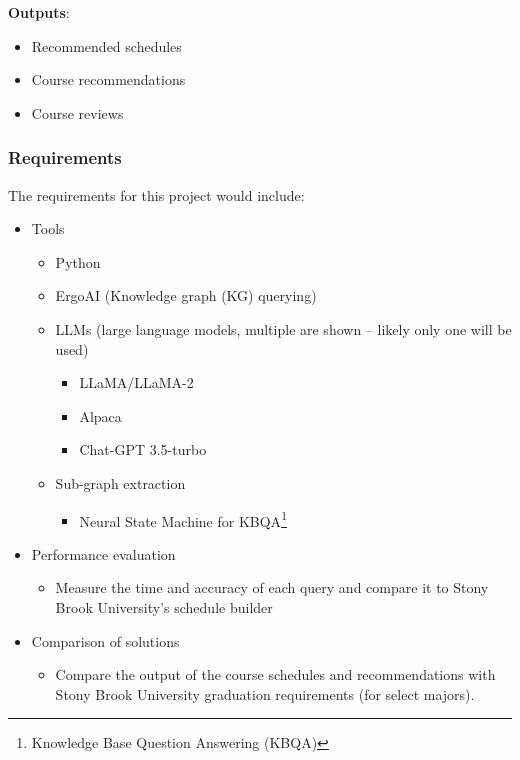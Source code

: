 \documentclass[12pt]{article}
\begin{document}
    \textbf{Outputs}:

    \begin{itemize}
        \label{items:outputs}
        \item Recommended schedules
        \item Course recommendations
        \item Course reviews
    \end{itemize}

    \subsubsection{Requirements}
    \label{subsubsec:reqs}
    The requirements for this project would include:

    \begin{itemize}
        \item Tools
        \begin{itemize}
            \item Python
            \item ErgoAI (Knowledge graph (KG) querying)
            \item LLMs (large language models, multiple are shown -- likely only one will be used)
            \begin{itemize}
                \item LLaMA\cite{touvron2023llama}/LLaMA-2\cite{touvron2023llama2}
                \item Alpaca\cite{alpaca}
                \item Chat-GPT 3.5-turbo\cite{ye2023gpt3.5}
            \end{itemize}
            \item Sub-graph extraction
            \begin{itemize}
                \item Neural State Machine for KBQA\footnote{Knowledge Base Question Answering (KBQA)}\cite{He-WSDM-2021}
            \end{itemize}
        \end{itemize}
        \item Performance evaluation
            \begin{itemize}
                \item Measure the time and accuracy of each query and compare it to Stony Brook University's schedule builder\cite{sched}
            \end{itemize}
        \item Comparison of solutions
            \begin{itemize}
                \item Compare the output of the course schedules and recommendations with Stony Brook University graduation requirements (for select majors).
            \end{itemize}
    \end{itemize}
    
\end{document}
